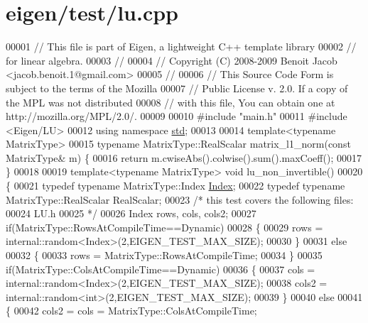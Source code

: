 \hypertarget{eigen_2test_2lu_8cpp_source}{}\section{eigen/test/lu.cpp}
\label{eigen_2test_2lu_8cpp_source}

\begin{DoxyCode}
00001 \textcolor{comment}{// This file is part of Eigen, a lightweight C++ template library}
00002 \textcolor{comment}{// for linear algebra.}
00003 \textcolor{comment}{//}
00004 \textcolor{comment}{// Copyright (C) 2008-2009 Benoit Jacob <jacob.benoit.1@gmail.com>}
00005 \textcolor{comment}{//}
00006 \textcolor{comment}{// This Source Code Form is subject to the terms of the Mozilla}
00007 \textcolor{comment}{// Public License v. 2.0. If a copy of the MPL was not distributed}
00008 \textcolor{comment}{// with this file, You can obtain one at http://mozilla.org/MPL/2.0/.}
00009 
00010 \textcolor{preprocessor}{#include "main.h"}
00011 \textcolor{preprocessor}{#include <Eigen/LU>}
00012 \textcolor{keyword}{using namespace }\hyperlink{namespacestd}{std};
00013 
00014 \textcolor{keyword}{template}<\textcolor{keyword}{typename} MatrixType>
00015 \textcolor{keyword}{typename} MatrixType::RealScalar matrix\_l1\_norm(\textcolor{keyword}{const} MatrixType& m) \{
00016   \textcolor{keywordflow}{return} m.cwiseAbs().colwise().sum().maxCoeff();
00017 \}
00018 
00019 \textcolor{keyword}{template}<\textcolor{keyword}{typename} MatrixType> \textcolor{keywordtype}{void} lu\_non\_invertible()
00020 \{
00021   \textcolor{keyword}{typedef} \textcolor{keyword}{typename} MatrixType::Index \hyperlink{namespace_eigen_a62e77e0933482dafde8fe197d9a2cfde}{Index};
00022   \textcolor{keyword}{typedef} \textcolor{keyword}{typename} MatrixType::RealScalar RealScalar;
00023   \textcolor{comment}{/* this test covers the following files:}
00024 \textcolor{comment}{     LU.h}
00025 \textcolor{comment}{  */}
00026   Index rows, cols, cols2;
00027   \textcolor{keywordflow}{if}(MatrixType::RowsAtCompileTime==Dynamic)
00028   \{
00029     rows = internal::random<Index>(2,EIGEN\_TEST\_MAX\_SIZE);
00030   \}
00031   \textcolor{keywordflow}{else}
00032   \{
00033     rows = MatrixType::RowsAtCompileTime;
00034   \}
00035   \textcolor{keywordflow}{if}(MatrixType::ColsAtCompileTime==Dynamic)
00036   \{
00037     cols = internal::random<Index>(2,EIGEN\_TEST\_MAX\_SIZE);
00038     cols2 = internal::random<int>(2,EIGEN\_TEST\_MAX\_SIZE);
00039   \}
00040   \textcolor{keywordflow}{else}
00041   \{
00042     cols2 = cols = MatrixType::ColsAtCompileTime;

\end{DoxyCode}
